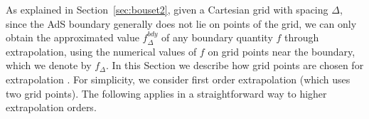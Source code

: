 \documentclass[a4paper,11pt]{article}
\begin{document}
As explained in Section~\ref{sec:bouset2}, given a Cartesian grid with spacing $\Delta$, since the AdS boundary generally does not lie on points of the grid, we can only obtain the approximated value $f^{bdy}_{\Delta}$ of any boundary quantity $f$ through extrapolation, using the numerical values of $f$ on grid points near the boundary, which we denote by $f_\Delta$. In this Section we describe how grid points are chosen for extrapolation%
. For simplicity, we consider first order extrapolation (which uses two grid points). The following applies in a straightforward way to higher extrapolation orders.
\end{document}
